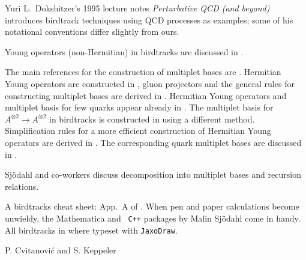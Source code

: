 {Yuri L.\ Dokshitzer's 1995 lecture notes {\it Perturbative QCD (and
    beyond)} introduces birdtrack techniques using
  QCD processes as examples; some of his notational conventions differ
  slightly from ours.

Young operators (non-Hermitian) in birdtracks are discussed in
 .

The main references for the construction of multiplet bases are
 . Hermitian Young operators are constructed
  in , gluon projectors and the general rules for
  constructing multiplet bases are derived in .
  Hermitian Young operators and multiplet basis for few quarks appear
  already in . The multiplet basis for
  $A^{\otimes 2}\to A^{\otimes 2}$ in birdtracks is constructed in
  using a different method.
  Simplification rules for a more efficient construction of Hermitian
  Young operators are derived in . The
  corresponding quark multiplet bases are discussed in
 .

Sj{\"o}dahl and co-workers discuss decomposition into multiplet
  bases and recursion relations.

A birdtracks cheat sheet: App.~A of .
When pen and paper calculations become unwieldy, the Mathematica and {\tt
C++} packages by Malin Sj{\"o}dahl come in handy.
All birdtracks in
 where typeset with {\tt JaxoDraw}.

\hfill P. Cvitanovi{\'c} and S. Keppeler
} %


\RemarksEnd

\printbibliography[heading=subbibintoc,title={References}]
